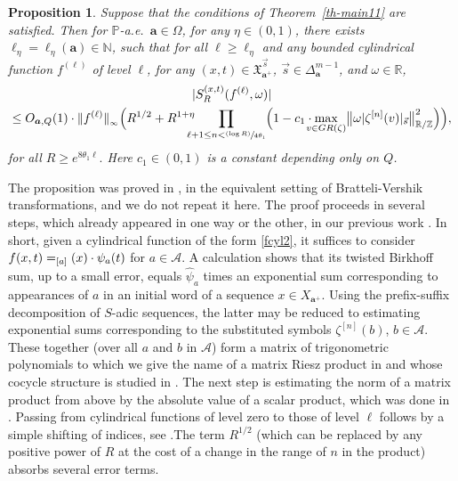 \documentclass[11pt]{article}
\makeatletter
\numberwithin{equation}{section}\newcommand{\Relation}[2][]{}\newtheorem*{prop*}{Proposition}
\DeclareRobustCommand{\mathbbm}[1]{\csname jepbb@#1\endcsname}
\let\mathcal\mathscr
\newcommand{\One}{\mathbbm{1}}
\newcommand{\psfrac}[2]{\sfrac{(#1)}{#2}}
\theoremstyle{plain}
\newtheorem{prop}[theorem]{Proposition}
\theoremstyle{definition}
\newcommand\bom{{\boldsymbol a}}\let\ba\bom
\let\om\omega
\let\Om\Omega
\newcommand\Xx{\mathfrak{X}}
\newcommand\Ak{\mathcal{A}}
\newcommand{\R}{\mathbb{R}}
\newcommand{\Z}{\mathbb{Z}}
\newcommand{\N}{\mathbb{N}}
\renewcommand{\P}{\mathbb{P}}
\makeatother
\begin{document}
\begin{prop} \label{prop-Dioph4} Suppose that the conditions of Theorem~\ref{th-main11} are satisfied. Then
for $\P$-a.e.\ $\bom\in \Om$,
for any $\eta\in (0,1)$, there exists $\ell_\eta=\ell_\eta(\bom)\in \N$, such that
for all $\ell\ge \ell_\eta$ and any bounded cylindrical function $f^{(\ell)}$ of level $\ell$,
for any $(x,t)\in \Xx_{\bom^+}^{\vec{s}}$, $\vec s\in \Delta_\bom^{m-1}$, and $\om\in \R$,
\begin{multline}
\label{eq-Dioph3}
|S^{(x,t)}_R(f^{(\ell)},\om)|\\
\le O_{\bom,Q}(1)\cdot \|f^{(\ell)}\|_{_\infty} \Bigl(R^{1/2}+ R^{1+\eta}\!\!\!\!\!\prod_{\ell+1\le n < \psfrac{\log R}{4\theta_1}}
\Bigl( 1 - c_1\cdot \!\!\!\! \max_{v\in GR(\zeta)}\bigl\| \om|\zeta^{[n]}(v)|_{\vec{s}}\bigr\|^2_{\R/\Z}\Bigr)\Bigr),
\end{multline}
for all
$
R\ge e^{8\theta_1 \ell}.
$
Here $c_1\in (0,1)$ is a constant depending only on $Q$.
\end{prop}

The proposition was proved in \cite[Prop.\,7.1]{BuSo18a}, in the equivalent setting of Bratteli-Vershik transformations, and we do not repeat it here. The proof proceeds in several steps, which already appeared in one way or the other, in our previous work \cite{BuSol2,BuSo18a,BuSo19}.
In short, given a cylindrical function of the form \eqref{fcyl2}, it suffices to consider $f(x,t)=\One_{[a]}(x) \cdot \psi_a(t)$ for $a\in \Ak$. A calculation shows that its twisted Birkhoff sum, up to a small error, equals $\widehat{\psi}_a$ times an exponential sum corresponding to appearances of $a$ in an initial word of a sequence $x\in X_{\bom^+}$. Using the prefix-suffix decomposition of $S$-adic sequences, the latter may be reduced to estimating exponential sums corresponding to the substituted symbols $\zeta^{[n]}(b)$, $b\in \Ak$. These together (over all $a$ and $b$ in $\Ak$) form a matrix of trigonometric polynomials to which we give the name of a matrix Riesz product in
\cite[\S3.2]{BuSo18a} and whose cocycle structure is studied in \cite{BuSo19}. The next step is estimating the norm of a matrix product from above by the absolute value of a scalar product, which was done in \cite[Prop.\,3.4]{BuSo18a}. Passing from cylindrical functions of level zero to those of level $\ell$ follows by a simple shifting of indices, see \cite[\S3.5]{BuSo18a}.The term $R^{1/2}$ (which can be replaced by any positive power of $R$ at the cost of a change in the range of $n$ in the product) absorbs several error terms.
\end{document}
